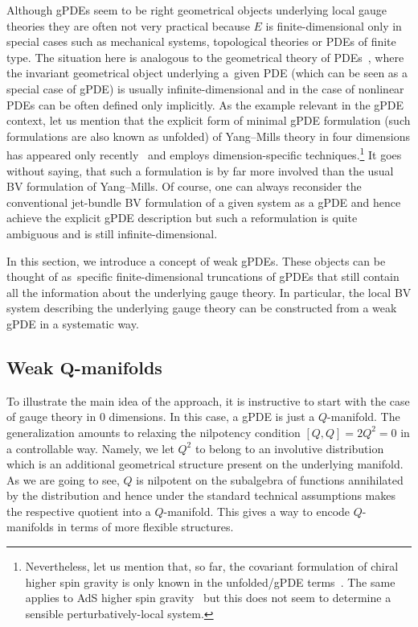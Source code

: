 \documentclass[10pt,a4paper]{amsart}
\numberwithin{equation}{section}
\theoremstyle{definition}
\begin{document}
Although gPDEs seem to be right geometrical objects underlying local gauge theories they are often not very practical because $E$ is finite-dimensional only in special cases such as mechanical systems, topological theories or PDEs of finite type. The situation here is analogous to the geometrical theory of PDEs~\cite{Krasil?shchik-Lychagin-Vinogradov,Krasil'shchik:2010ij, Vinogradov1981}, where the invariant geometrical object underlying a~given PDE (which can be seen as a special case of gPDE) is usually infinite-dimensional and in the case of nonlinear PDEs can be often defined only implicitly. As the example relevant in the gPDE context, let us mention that the explicit form of minimal gPDE formulation (such formulations are also known as unfolded) of Yang--Mills theory in four dimensions has appeared only recently~\cite{Misuna:2024dlx} and employs dimension-specific techniques.\footnote{Nevertheless, let us mention that, so far, the covariant formulation of chiral higher spin gravity is only known in the unfolded/gPDE terms~\cite{Sharapov:2022faa, Sharapov:2022wpz}. The same applies to AdS higher spin gravity~\cite{Vasiliev:1999ba, Vasiliev:2003ev} but this does not seem to determine a sensible perturbatively-local system.} It goes without saying, that such a formulation is by far more involved than the usual BV formulation of Yang--Mills. Of course, one can always reconsider the conventional jet-bundle BV formulation of a given system as a gPDE and hence achieve the explicit gPDE description but such a reformulation is quite ambiguous and is still infinite-dimensional.

In this section, we introduce a concept of weak gPDEs. These objects can be thought of as~specific finite-dimensional truncations of gPDEs that still contain all the information about the underlying gauge theory. In particular, the local BV system describing the underlying gauge theory can be constructed from a weak gPDE in a systematic way.

\subsection[Weak Q-manifolds]{Weak $\boldsymbol{Q}$-manifolds}

To illustrate the main idea of the approach, it is instructive to start with the %
case of gauge theory in 0 dimensions. In this case, a gPDE is just a $Q$-manifold.
The generalization amounts to relaxing the nilpotency condition $[Q,Q]=2Q^2=0$ in a controllable way. Namely, we let $Q^2$ to belong to an involutive distribution which is an additional geometrical structure present on the underlying manifold. As we are going to see, $Q$ is nilpotent on the subalgebra of functions annihilated by the distribution and hence under the standard technical assumptions makes the respective quotient into a $Q$-manifold. This gives a way to encode $Q$-manifolds in terms of more flexible structures.
\end{document}
